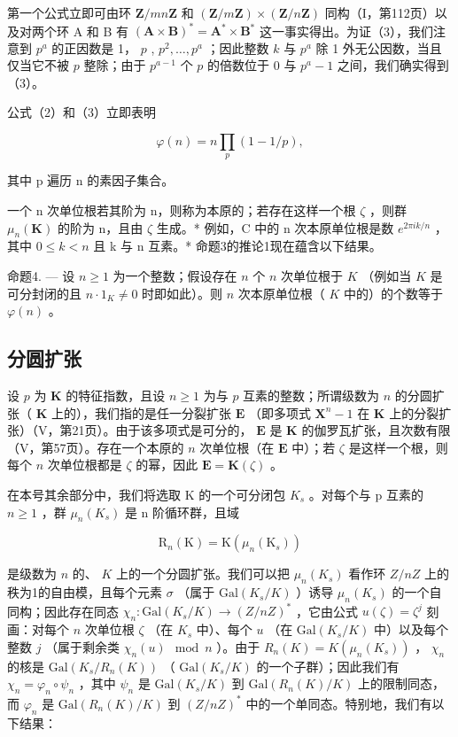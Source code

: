 第一个公式立即可由环 \(\mathbf{Z} / mn\mathbf{Z}\) 和 \((\mathbf{Z} / m\mathbf{Z}) \times (\mathbf{Z} / n\mathbf{Z})\) 同构（I，第112页）以及对两个环 A 和 B 有 \((\mathbf{A} \times \mathbf{B})^{*} = \mathbf{A}^{*} \times \mathbf{B}^{*}\) 这一事实得出。为证（3），我们注意到 \(p^{a}\) 的正因数是 1， \(p\) , \(p^{2}, \ldots, p^{a}\) ；因此整数 \(k\) 与 \(p^{a}\) 除 1 外无公因数，当且仅当它不被 \(p\) 整除；由于 \(p^{a-1}\) 个 \(p\) 的倍数位于 0 与 \(p^{a}-1\) 之间，我们确实得到（3）。

公式（2）和（3）立即表明

\[
\varphi (n) = n \prod_ {p} (1 - 1 / p),\tag{4}
\]

其中 p 遍历 n 的素因子集合。

一个 n 次单位根若其阶为 n，则称为本原的；若存在这样一个根 \(\zeta\) ，则群 \(\mu_{n}(\mathbf{K})\) 的阶为 n，且由 \(\zeta\) 生成。* 例如，C 中的 n 次本原单位根是数 \(e^{2\pi ik/n}\) ，其中 \(0 \leqslant k < n\) 且 k 与 n 互素。* 命题3的推论1现在蕴含以下结果。

命题4. --- 设 \(n \geqslant 1\) 为一个整数；假设存在 \(n\) 个 \(n\) 次单位根于 \(K\) （例如当 \(K\) 是可分封闭的且 \(n \cdot 1_{K} \neq 0\) 时即如此）。则 \(n\) 次本原单位根（ \(K\) 中的）的个数等于 \(\varphi(n)\) 。

\subsection{分圆扩张}

设 \(p\) 为 \(\mathbf{K}\) 的特征指数，且设 \(n \geqslant 1\) 为与 \(p\) 互素的整数；所谓级数为 \(n\) 的分圆扩张（ \(\mathbf{K}\) 上的），我们指的是任一分裂扩张 \(\mathbf{E}\) （即多项式 \(\mathbf{X}^n - 1\) 在 \(\mathbf{K}\) 上的分裂扩张）（V，第21页）。由于该多项式是可分的， \(\mathbf{E}\) 是 \(\mathbf{K}\) 的伽罗瓦扩张，且次数有限（V，第57页）。存在一个本原的 \(n\) 次单位根（在 \(\mathbf{E}\) 中）；若 \(\zeta\) 是这样一个根，则每个 \(n\) 次单位根都是 \(\zeta\) 的幂，因此 \(\mathbf{E} = \mathbf{K}(\zeta)\) 。

在本号其余部分中，我们将选取 K 的一个可分闭包 \(K_{s}\) 。对每个与 p 互素的 \(n \geqslant 1\) ，群 \(\mu_{n}(K_{s})\) 是 n 阶循环群，且域

\[
\mathrm{R} _ {n} (\mathrm{K}) = \mathrm{K} \left(\mu_ {n} \left(\mathrm{K} _ {s}\right)\right)
\]

是级数为 \(n\) 的、 \(K\) 上的一个分圆扩张。我们可以把 \(\mu_n(K_s)\) 看作环 \(Z/nZ\) 上的秩为1的自由模，且每个元素 \(\sigma\) （属于 \(\text{Gal}(K_s/K)\) ）诱导 \(\mu_n(K_s)\) 的一个自同构；因此存在同态 \(\chi_n: \text{Gal}(K_s/K) \to (Z/nZ)^*\) ，它由公式 \(u(\zeta) = \zeta^j\) 刻画：对每个 \(n\) 次单位根 \(\zeta\) （在 \(K_s\) 中）、每个 \(u\) （在 \(\text{Gal}(K_s/K)\) 中）以及每个整数 \(j\) （属于剩余类 \(\chi_n(u) \mod n\) ）。由于 \(R_n(K) = K(\mu_n(K_s))\) ， \(\chi_n\) 的核是 \(\text{Gal}(K_s/R_n(K))\) （ \(\text{Gal}(K_s/K)\) 的一个子群）；因此我们有 \(\chi_n = \varphi_n \circ \psi_n\) ，其中 \(\psi_n\) 是 \(\text{Gal}(K_s/K)\) 到 \(\text{Gal}(R_n(K)/K)\) 上的限制同态，而 \(\varphi_n\) 是 \(\text{Gal}(R_n(K)/K)\) 到 \((Z/nZ)^*\) 中的一个单同态。特别地，我们有以下结果：

